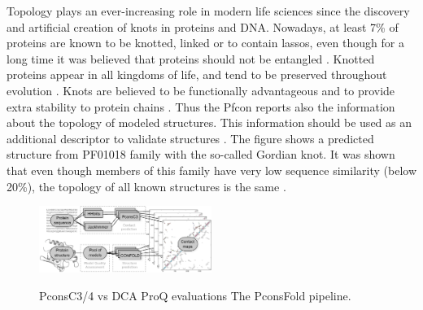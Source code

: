 \documentclass[a4,center,fleqn]{NAR}
\begin{document}
Topology plays an ever-increasing role in modern life sciences since
the discovery and artificial creation of knots in proteins and DNA.
Nowadays, at least 7\% of proteins are known to be knotted, linked or
to contain lassos, even though for a long time it was believed that
proteins should not be entangled \cite{sulkowska2018entangled}. Knotted proteins appear in all
kingdoms of life, and tend to be preserved throughout evolution \cite{sulkowska2012conservation}. 
Knots are believed to be functionally advantageous and to provide extra
stability to protein chains \cite{christian2016methyl}.
Thus the Pfcon reports also the information about the topology of
modeled structures. This information should be used as an additional
descriptor to validate structures \cite{khatib2006rapid}. The figure shows a
predicted structure from PF01018 family with the so-called Gordian
knot. It was shown that even though members of this family have very
low sequence similarity (below 20\%), the topology of all known
structures is the same \cite{sulkowska2012conservation}.


\begin{figure}[t]
\begin{center}
\end{center}
\caption{PconsC3/4 vs DCA
ProQ evaluations 
The PconsFold pipeline.}
    \includegraphics[width=0.5\textwidth]{figures/flowchart.eps}
\label{fig:Pipeline}
\end{figure}
\end{document}
